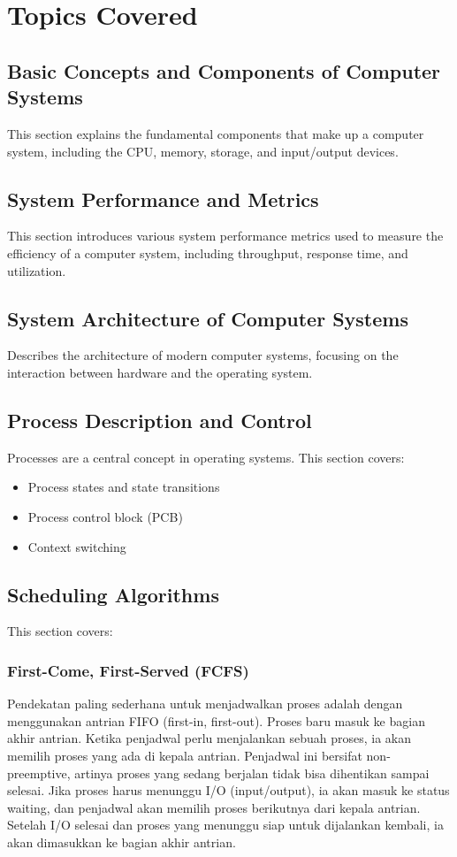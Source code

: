 \documentclass[12pt]{article}
\begin{document}
	\section{Topics Covered}
	
	\subsection{Basic Concepts and Components of Computer Systems}
	This section explains the fundamental components that make up a computer system, including the CPU, memory, storage, and input/output devices.
	
	\subsection{System Performance and Metrics}
	This section introduces various system performance metrics used to measure the efficiency of a computer system, including throughput, response time, and utilization.
	
	\subsection{System Architecture of Computer Systems}
	Describes the architecture of modern computer systems, focusing on the interaction between hardware and the operating system.
	
	\subsection{Process Description and Control}
	Processes are a central concept in operating systems. This section covers:
	\begin{itemize}
		\item Process states and state transitions
		\item Process control block (PCB)
		\item Context switching
	\end{itemize}
	
	\subsection{Scheduling Algorithms}
	This section covers:
	\subsubsection{First-Come, First-Served (FCFS)}
	Pendekatan paling sederhana untuk menjadwalkan proses adalah dengan menggunakan antrian FIFO (first-in, first-out). Proses baru masuk ke bagian akhir antrian. Ketika penjadwal perlu menjalankan sebuah proses, ia akan memilih proses yang ada di kepala antrian. Penjadwal ini bersifat non-preemptive, artinya proses yang sedang berjalan tidak bisa dihentikan sampai selesai. Jika proses harus menunggu I/O (input/output), ia akan masuk ke status waiting, dan penjadwal akan memilih proses berikutnya dari kepala antrian. Setelah I/O selesai dan proses yang menunggu siap untuk dijalankan kembali, ia akan dimasukkan ke bagian akhir antrian.
	
\end{document}
